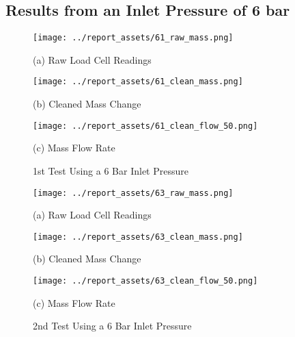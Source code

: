 \subsection{Results from an Inlet Pressure of 6 bar}
\vfill
\begin{figure}[htbp]
    \centering

    \begin{minipage}{0.32\textwidth}
        \centering
        \texttt{[image: ../report\_assets/61\_raw\_mass.png]}
        \caption*{(a) Raw Load Cell Readings}
    \end{minipage}
    \hfill
    \begin{minipage}{0.32\textwidth}
        \centering
        \texttt{[image: ../report\_assets/61\_clean\_mass.png]}
        \caption*{(b) Cleaned Mass Change}
    \end{minipage}
    \hfill
    \begin{minipage}{0.32\textwidth}
        \centering
        \texttt{[image: ../report\_assets/61\_clean\_flow\_50.png]}
        \caption*{(c) Mass Flow Rate}
    \end{minipage}
    \caption{1st Test Using a 6 Bar Inlet Pressure}
    
\end{figure}\label{fig:61}

\vfill
\begin{figure}[htbp]
    \centering

    \begin{minipage}{0.32\textwidth}
        \centering
        \texttt{[image: ../report\_assets/63\_raw\_mass.png]}
        \caption*{(a) Raw Load Cell Readings}
    \end{minipage}
    \hfill
    \begin{minipage}{0.32\textwidth}
        \centering
        \texttt{[image: ../report\_assets/63\_clean\_mass.png]}
        \caption*{(b) Cleaned Mass Change}
    \end{minipage}
    \hfill
    \begin{minipage}{0.32\textwidth}
        \centering
        \texttt{[image: ../report\_assets/63\_clean\_flow\_50.png]}
        \caption*{(c) Mass Flow Rate}
    \end{minipage}
    \caption{2nd Test Using a 6 Bar Inlet Pressure}
    
\end{figure}\label{fig:63}

